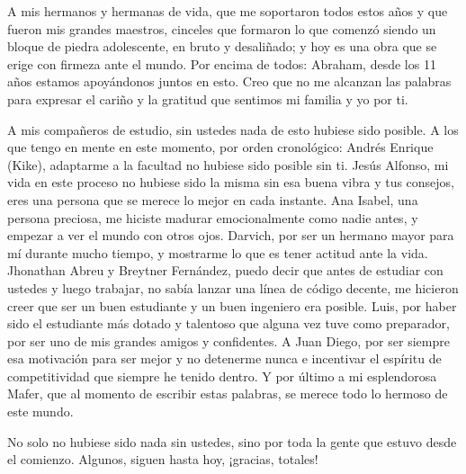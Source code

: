 \par
A mis hermanos y hermanas de vida, que me soportaron todos estos años y que fueron mis grandes maestros, cinceles que formaron lo que comenzó siendo un bloque de piedra adolescente, en bruto y desaliñado; y hoy es una obra que se erige con firmeza ante el mundo. Por encima de todos: Abraham, desde los 11 años estamos apoyándonos juntos en esto. Creo que no me alcanzan las palabras para expresar el cariño y la gratitud que sentimos mi familia y yo por ti.
\par
A mis compañeros de estudio, sin ustedes nada de esto hubiese sido posible. A los que tengo en mente en este momento, por orden cronológico: Andrés Enrique (Kike), adaptarme a la facultad no hubiese sido posible sin ti. Jesús Alfonso, mi vida en este proceso no hubiese sido la misma sin esa buena vibra y tus consejos, eres una persona que se merece lo mejor en cada instante. Ana Isabel, una persona preciosa, me hiciste madurar emocionalmente como nadie antes, y empezar a ver el mundo con otros ojos. Darvich, por ser un hermano mayor para mí durante mucho tiempo, y mostrarme lo que es tener actitud ante la vida. Jhonathan Abreu y Breytner Fernández, puedo decir que antes de estudiar con ustedes y luego trabajar, no sabía lanzar una línea de código decente, me hicieron creer que ser un buen estudiante y un buen ingeniero era posible. Luis, por haber sido el estudiante más dotado y talentoso que alguna vez tuve como preparador, por ser uno de mis grandes amigos y confidentes. A Juan Diego, por ser siempre esa motivación para ser mejor y no detenerme nunca e incentivar el espíritu de competitividad que siempre he tenido dentro. Y por último a mi esplendorosa Mafer, que al momento de escribir estas palabras, se merece todo lo hermoso de este mundo.
\par
No solo no hubiese sido nada sin ustedes, sino por toda la gente que estuvo desde el comienzo. Algunos, siguen hasta hoy, ¡gracias, totales!